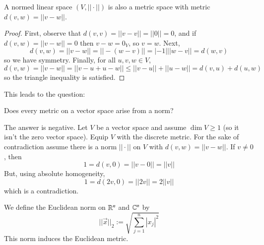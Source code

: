 \begin{prop}
    A normed linear space $(V,||\cdot||)$ is also a metric space with metric $d(v,w) = ||v-w||$.
\end{prop}
\begin{proof}
    First, observe that $d(v,v) = ||v-v|| = ||0|| = 0$, and if $d(v,w) = ||v-w|| = 0$ then $v-w = 0_V$, so $v = w$. Next, $$d(v,w) = ||v-w|| = ||-(w-v)|| = |-1|||w-v|| = d(w,v)$$ so we have symmetry. Finally, for all $u,v,w \in V$, $$d(v,w) = ||v-w|| = ||v-u+u-w|| \leq ||v-u||+||u-w|| = d(v,u)+d(u,w)$$ so the triangle inequality is satisfied.
\end{proof}


This leads to the question: 
\begin{qst}
    Does every metric on a vector space arise from a norm?
\end{qst}
The answer is negative. Let $V$ be a vector space and assume $\dim V \geq 1$ (so it isn't the zero vector space). Equip $V$ with the discrete metric. For the sake of contradiction assume there is a norm $||\cdot||$ on $V$ with $d(v,w) = ||v-w||$. If $v \neq 0$, then $$1 = d(v,0) = ||v-0|| = ||v||$$ But, using absolute homogeneity, $$1 = d(2v,0) = ||2v|| = 2||v||$$ which is a contradiction.

\begin{eg}
    We define the Euclidean norm on $\mathbb R^n$ and $\mathbb C^n$ by $$||\vec{x}||_2 := \sqrt{\sum_{j=1}^n|x_j|^2}$$ This norm induces the Euclidean metric.
\end{eg}

